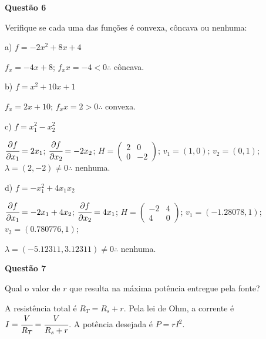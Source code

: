 \documentclass{rbfin}
\begin{document}
\large

\textbf{Questão 6}

\normalsize

\vspace{6mm}

\doublespacing

Verifique se cada uma das funções é convexa, côncava ou nenhuma:

a) $f = -2x^2 + 8x + 4$

$f_x = -4x + 8$; $f_xx = -4 < 0 \therefore$ côncava.

\dotfill

b) $f = x^2 + 10x + 1$

$f_x = 2x + 10$; $f_xx = 2 > 0 \therefore$ convexa.

\dotfill

c) $f = x_1^2 - x_2^2$

$\cfrac{\partial f}{\partial x_1} = 2 x_1$; $\cfrac{\partial f}{\partial x_2} = -2 x_2$; $H = \begin{pmatrix} 2 & 0 \\ 0 & -2 \end{pmatrix}$; $v_1 = (1, 0)$; $v_2 = (0, 1)$; $\lambda = (2, -2) \ne 0 \therefore$ nenhuma.

\dotfill
\newpage

d) $f = -x_1^2 + 4x_1x_2$

$\cfrac{\partial f}{\partial x_1} = -2 x_1 + 4 x_2$; $\cfrac{\partial f}{\partial x_2} = 4 x_1$; $H = \begin{pmatrix} -2 & 4 \\ 4 & 0 \end{pmatrix}$; $v_1 = (-1.28078, 1)$; $v_2 = (0.780776, 1)$; 

$\lambda = (-5.12311, 3.12311) \ne 0 \therefore$ nenhuma.

\singlespacing

\vspace{6mm}

\large

\textbf{Questão 7}

\normalsize

\vspace{6mm}

\doublespacing

Qual o valor de $r$ que resulta na máxima potência entregue pela fonte?

A resistência total é $R_T = R_s + r$. Pela lei de Ohm, a corrente é $I = \cfrac{V}{R_T} = \cfrac{V}{R_s + r}$. A potência desejada é $P = rI^2$.
\end{document}
